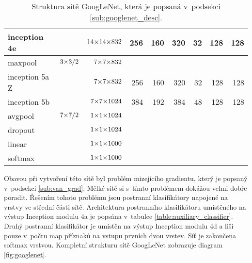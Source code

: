 \begin{table}
{\begin{tabularx}{1.2\textwidth}{l|R|R|r|R|r|R|r|R}
    inception 4e & & $\sisetup{tight-spacing=true}14{\times}14{\times}832$ & 256 & 160 & 320 & 32 & 128 & 128\\
    \hline
    maxpool & $\sisetup{tight-spacing=true}3{\times}3/2$ & $\sisetup{tight-spacing=true}7{\times}7{\times}832$ & & & & & & \\
    \hline
    inception 5a Z& & $\sisetup{tight-spacing=true}7{\times}7{\times}832$ & 256 & 160 & 320 & 32 & 128 & 128\\
    inception 5b & & $\sisetup{tight-spacing=true}7{\times}7{\times}1024$ & 384 & 192 & 384 & 48 & 128 & 128\\
    \hline
    avgpool & $\sisetup{tight-spacing=true}7{\times}7/2$ & $\sisetup{tight-spacing=true}1{\times}1{\times}1024$ & & & & & & \\
    \hline
    dropout & & $\sisetup{tight-spacing=true}1{\times}1{\times}1024$ & & & & & & \\
    linear & & $\sisetup{tight-spacing=true}1{\times}1{\times}1000$ & & & & & & \\
    softmax & & $\sisetup{tight-spacing=true}1{\times}1{\times}1000$ & & & & & & \\
\end{tabularx}
}
\caption{Struktura sítě GoogLeNet, která je popsaná v~podsekci \ref{sub:googlenet_desc}.}
\label{table:googlenet}
\end{table}

Obavou při vytvoření této sítě byl problém mizejícího gradientu, který je popsaný v~podsekci \ref{sub:van_grad}.
Mělké sítě si s~tímto problémem dokážou velmi dobře poradit.
Řešením tohoto problému jsou postranní klasifikátory napojené na vrstvy ve střední části sítě.
Architektura postranního klasifikátoru umístěného na výstup Inception modulu 4a je popsána v~tabulce \ref{table:auxiliary_classifier}.
Druhý postranní klasifikátor je umístěn na výstup Inception modulu 4d a liší pouze v~počtu map příznaků na vstupu prvních dvou vrstev.
Síť je zakončena softmax vrstvou.
Kompletní strukturu sítě GoogLeNet zobrazuje diagram \ref{fig:googlenet}.

